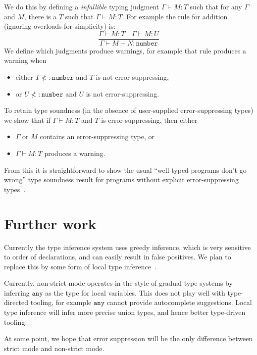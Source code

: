 \documentclass[acmsmall]{acmart}
\newcommand{\ANY}{\mathtt{any}}
\newcommand{\NUMBER}{\mathtt{number}}
\begin{document}
We do this by defining a \emph{infallible} typing judgment $\Gamma \vdash M : T$
such that for any $\Gamma$ and $M$, there is a $T$ such that $\Gamma \vdash M : T$.
For example the rule for addition (ignoring overloads for simplicity) is:
\[
  \frac{\Gamma \vdash M : T \quad \Gamma \vdash M : U}{\Gamma \vdash M+N : \NUMBER} 
\]
We define which judgments produce warnings, for example that rule produces a warning
when
\begin{itemize}
  \item either $T \not<: \NUMBER$ and $T$ is not error-suppressing,
  \item or $U \not<: \NUMBER$ and $U$ is not error-suppressing.
\end{itemize}
To retain type soundness (in the absence of user-supplied error-suppressing types)
we  show that
if $\Gamma \vdash M : T$ and $T$ is error-suppressing, then either
\begin{itemize}
  \item $\Gamma$ or $M$ contains an error-suppressing type, or
  \item $\Gamma \vdash M : T$ produces a warning.
\end{itemize}
From this it is straightforward to show the usual ``well typed
programs don't go wrong'' type soundness result for programs without explicit
error-suppressing types~\cite{BJ23:agda-typeck}.

\section{Further work}

Currently the type inference system uses greedy inference, which is
very sensitive to order of declarations, and can easily result in
false positives. We plan to replace this by some form of local type
inference~\cite{PT00:LocalTypeInference}.

Currently, non-strict mode operates in the style of gradual type
systems by inferring $\ANY$ as the type for local variables. This does
not play well with type-directed tooling, for example $\ANY$ cannot
provide autocomplete suggestions. Local type inference will infer more
precise union types, and hence better type-driven tooling.

At some point, we hope that error suppression will be the only difference
between strict mode and non-strict mode.

 
\end{document}

